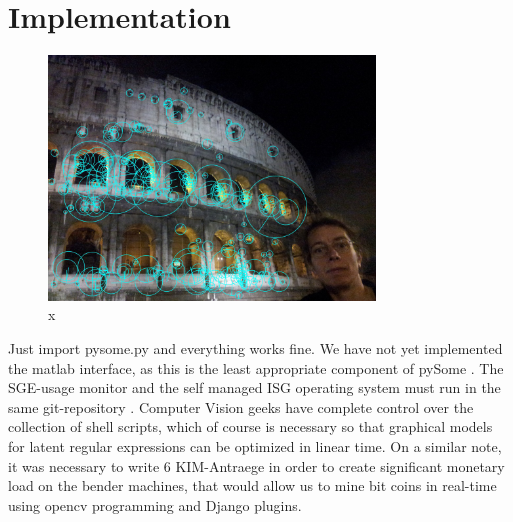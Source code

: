 \documentclass[runningheads]{llncs}
\begin{document}
\section{Implementation}
\begin{figure} \centering \includegraphics[height=6.5cm]{images/tanner.jpg}
\caption{x} \label{fig:label13} \end{figure}
Just import pysome.py and everything works fine. 
We have not yet implemented the matlab interface, as this is the
least appropriate component of pySome \cite{cite:30}.  The SGE-usage monitor and the self managed ISG operating system must run in the same git-repository
\cite{cite:31}.  Computer Vision geeks have complete control over the collection of
shell scripts, which of course is necessary so that graphical models for latent regular expressions 
can be optimized in linear time.  On a similar note, it was necessary to write 6 KIM-Antraege in order to create significant monetary load on the bender machines, that would allow us to mine bit coins in real-time using opencv programming and Django plugins. 
\end{document}
